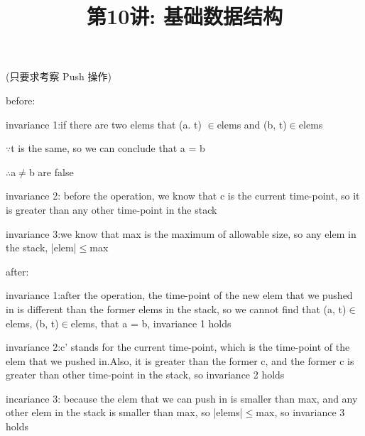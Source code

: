 \documentclass[a4paper, justified]{tufte-handout}
\title{第10讲: 基础数据结构}
\date{\zhtoday} %
\begin{document}
\maketitle
\noplagiarism %
\begin{abstract}
\end{abstract}
\beginrequired

\begin{problem}[MA 2.6]
(只要求考察 Push 操作)
\end{problem}

\begin{solution}
  before:

  invariance 1:if there are two elems that (a. t) $\in$elems and (b, t)$\in$elems

  $\because$t is the same, so we can conclude that a = b

  $\therefore$a$\ne$b are false

  invariance 2: before the operation, we know that c is the current time-point, so it is greater than any other time-point in the stack

  invariance 3:we know that max is the maximum of allowable size, so any elem in the stack, |elem|$\le$max

  after:

  invariance 1:after the operation, the time-point of the new elem that we  pushed in is different than the former elems in the stack, so we cannot find that (a, t)$\in$elems, (b, t)$\in$elems, that a = b, invariance 1 holds

  invariance 2:c' stands for the current time-point, which is the time-point of the elem that we pushed in.Also, it is greater than the former c, and the former c is greater than other time-point in the stack, so invariance 2 holds

  incariance 3: because the elem that we can push in is smaller than max, and any other elem in the stack is smaller than max, so |elems|$\le$max, so invariance 3 holds
\end{solution}


\begin{problem}[TC 10.1-4]
\end{problem}
\end{document}
